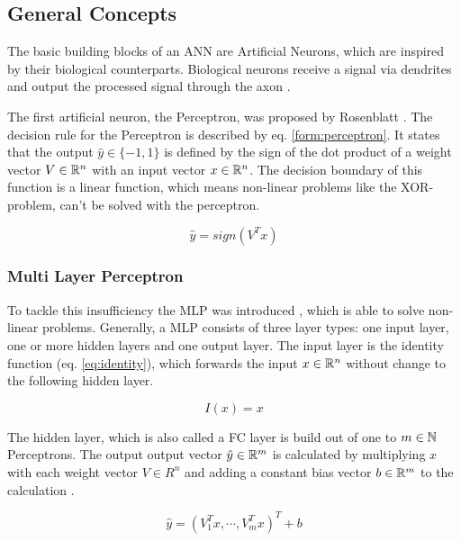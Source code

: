 \subsection{General Concepts}
\label{sec:deep_basics}

The basic building blocks of an \ac{ANN} are Artificial Neurons, which are inspired by  their biological counterparts.
Biological neurons receive a signal via dendrites and output the processed signal through the axon \cite{bioneuron}.

The first artificial neuron, the Perceptron, was proposed by Rosenblatt \cite{perceptron}.
The decision rule for the Perceptron is described by eq. \ref{form:perceptron}.
It states that the output $\hat{y} \in \{-1, 1\}$ is defined by the sign of the dot product of a weight vector $V \in \mathbb{R}^{n}$ with an input vector $x \in \mathbb{R}^{n}$.
The decision boundary of this function is a linear function, which means non-linear problems like the XOR-problem, can't be solved with the perceptron.

\begin{equation}
    \hat{y} = sign(V^Tx)
    \label{form:perceptron}
\end{equation}

\subsubsection{Multi Layer Perceptron}

To tackle this insufficiency the \ac{MLP} was introduced \cite{mlp}, which is able to solve non-linear problems.
Generally, a \ac{MLP} consists of three layer types: one input layer, one or more hidden layers and one output layer.
The input layer is the identity function (eq. \ref{eq:identity}), which forwards the input $x \in \mathbb{R}^n$ without change to the following hidden layer.

\begin{equation}
    I(x) = x
    \label{eq:identity}
\end{equation}

The hidden layer, which is also called a \ac{FC} layer \cite{dl} is build out of one to $m \in \mathbb{N}$ Perceptrons.
The output output vector $\hat{y} \in \mathbb{R}^m$ is calculated by multiplying $x$ with each weight vector $V \in R^n$ and adding a constant bias vector $b \in \mathbb{R}^m$ to the calculation \cite{dl_mit}.

\begin{equation}
    \hat{y} = (V_1^Tx, \cdots, V_m^Tx)^T + b
\end{equation}


